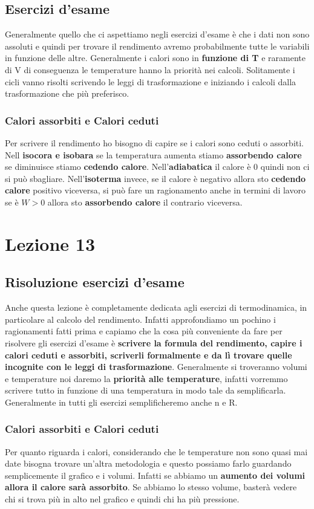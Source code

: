 \documentclass{article}
\numberwithin{equation}{subsection}
\begin{document}
\subsection{Esercizi d'esame}
Generalmente quello che ci aspettiamo negli esercizi d'esame è che i dati non sono assoluti e quindi per trovare il rendimento avremo probabilmente tutte le variabili in funzione delle altre. Generalmente i calori sono in \textbf{funzione di T} e raramente di V di conseguenza le temperature hanno la priorità nei calcoli. Solitamente i cicli vanno risolti scrivendo le leggi di trasformazione e iniziando i calcoli dalla trasformazione che più preferisco. 
\subsubsection{Calori assorbiti e Calori ceduti}
Per scrivere il rendimento ho bisogno di capire se i calori sono ceduti o assorbiti. Nell \textbf{isocora e isobara} se la temperatura aumenta stiamo \textbf{assorbendo calore} se diminuisce stiamo \textbf{cedendo calore}. Nell'\textbf{adiabatica} il calore è 0 quindi non ci si può sbagliare. Nell'\textbf{isoterma} invece, se il calore è negativo allora sto \textbf{cedendo calore} positivo viceversa, si può fare un ragionamento anche in termini di lavoro se è $W>0$ allora sto \textbf{assorbendo calore} il contrario viceversa.
\section{Lezione 13}
\subsection{Risoluzione esercizi d'esame}
Anche questa lezione è completamente dedicata agli esercizi di termodinamica, in particolare al calcolo del rendimento. Infatti approfondiamo un pochino i ragionamenti fatti prima e capiamo che la cosa più conveniente da fare per risolvere gli esercizi d'esame è \textbf{scrivere la formula del rendimento, capire i calori ceduti e assorbiti, scriverli formalmente e da lì trovare quelle incognite con le leggi di trasformazione}. Generalmente si troveranno volumi e temperature noi daremo la \textbf{priorità alle temperature}, infatti vorremmo scrivere tutto in funzione di una temperatura in modo tale da semplificarla. Generalmente in tutti gli esercizi semplificheremo anche n e R. 
\subsubsection{Calori assorbiti e Calori ceduti}
Per quanto riguarda i calori, considerando che le temperature non sono quasi mai date bisogna trovare un'altra metodologia e questo possiamo farlo guardando semplicemente il grafico e i volumi. Infatti se abbiamo un \textbf{aumento dei volumi allora il calore sarà assorbito}. Se abbiamo lo stesso volume, basterà vedere chi si trova più in alto nel grafico e quindi chi ha più pressione.
\end{document}
